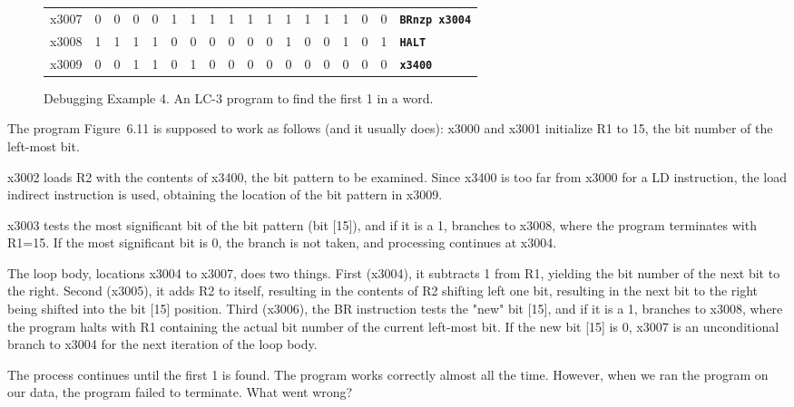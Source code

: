 \documentclass{patt}
\begin{document}
\begin{figure}
\begin{minipage}{36pc}
\begin{center}
\begin{tabular}{@{}l c c c c c c c c c c c c c c c c l}
x3007 & \multicolumn{1}{|c}{0} & 0 & 0 & \multicolumn{1}{c|}{0} & 1 & 1 & \multicolumn{1}{c|}{1} & 1 & 1 & 1 & 1 & 1 & 1 & 1 & 0 & \multicolumn{1}{c|}{0} & \multicolumn{1}{l}{\tt\bfseries BRnzp x3004}\\
\cline{2-17}
x3008 & \multicolumn{1}{|c}{1} & 1 & 1 & \multicolumn{1}{c|}{1} & 0 & 0 & 0 & 0 & 0 & 0 & 1 & 0 & 0 & 1 & 0 & \multicolumn{1}{c|}{1} & \multicolumn{1}{l}{\tt\bfseries HALT}\\
\cline{2-17}
x3009 & \multicolumn{1}{|c}{0} & 0 & 1 & 1 & 0 & 1 & 0 & 0 & 0 & 0 & 0 & 0 & 0 & 0 & 0 & \multicolumn{1}{c|}{0} & \multicolumn{1}{l}{\tt\bfseries x3400}\\
\cline{2-17}
\end{tabular}
\end{center}
\caption{Debugging Example 4.  An LC-3 program to find the first 1 in a word.
\label{fig:onlinedebug}}
\end{minipage}
\end{figure}

\FloatBarrier
The program Figure~6.11 is supposed to work as follows (and it usually does):
x3000 and x3001 initialize R1 to 15, the bit number of the left-most bit.

x3002 loads R2 with the contents of x3400, the bit pattern to be examined.
Since x3400 is too far from x3000 for a LD instruction, the load indirect
instruction is used, obtaining the location of the bit pattern in x3009.

x3003 tests the most significant bit of the bit pattern (bit [15]), and 
if it is a 1, branches to x3008, where the program terminates with R1=15.  
If the most significant bit is 0, the branch is not taken, and processing 
continues at x3004.

The loop body, locations x3004 to x3007, does two things.  First (x3004), 
it subtracts 1 from R1, yielding the bit number of the next bit to the right.  
Second (x3005), it adds R2 to itself, resulting in the contents of R2 
shifting left one bit, resulting in the next bit to the right being shifted 
into the bit [15] position.  Third (x3006), the BR instruction tests the
"new" bit [15], and if it is a 1, branches to x3008, where the program halts
with R1 containing the actual bit number of the current left-most bit.  If
the new bit [15] is 0, x3007 is an unconditional branch to x3004 for the
next iteration of the loop body.

The process continues until the first 1 is found.  The program works correctly
almost all the time. However, when we ran the program on our data,
the program failed to terminate.  What went wrong?
\end{document}
